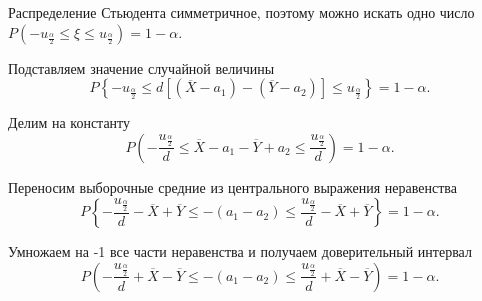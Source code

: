 Распределение Стьюдента симметричное,
поэтому можно искать одно число
$P \left( -u_{ \frac{ \alpha }{2}} \leq \xi \leq u_{ \frac{ \alpha }{2}} \right) =
  1 - \alpha $.

Подставляем значение случайной величины
$$P \left\{
    -u_{ \frac{ \alpha }{2}} \leq
    d \left[ \left( \overline{X} - a_1 \right) - \left( \overline{Y} - a_2 \right) \right] \leq
    u_{ \frac{ \alpha }{2}}
  \right\} =
  1 - \alpha.$$

Делим на константу
$$P \left(
    - \frac{u_{ \frac{ \alpha }{2}}}{d} \leq \overline{X} - a_1 - \overline{Y} + a_2 \leq
    \frac{u_{ \frac{ \alpha }{2}}}{d}
  \right) =
  1 - \alpha.$$

Переносим выборочные средние из центрального выражения неравенства
$$P \left\{
    - \frac{u_{ \frac{ \alpha }{2}}}{d} - \overline{X} + \overline{Y} \leq
    - \left( a_1 - a_2 \right) \leq
    \frac{u_{ \frac{ \alpha }{2}}}{d} - \overline{X} + \overline{Y}
  \right\} =
  1 - \alpha.$$

Умножаем на -1 все части неравенства и получаем доверительный интервал
$$P \left(
    - \frac{u_{ \frac{ \alpha }{2}}}{d} + \overline{X} - \overline{Y} \leq
    - \left( a_1 - a_2 \right) \leq
    \frac{u_{ \frac{ \alpha }{2}}}{d} + \overline{X} - \overline{Y}
  \right) =
  1 - \alpha.$$
